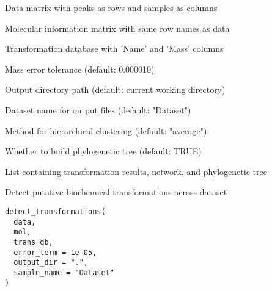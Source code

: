 \documentclass[a4paper]{book}
\begin{document}
%
\begin{Arguments}
\begin{ldescription}
\item[\code{data}] Data matrix with peaks as rows and samples as columns

\item[\code{mol}] Molecular information matrix with same row names as data

\item[\code{trans\_db}] Transformation database with 'Name' and 'Mass' columns

\item[\code{error\_term}] Mass error tolerance (default: 0.000010)

\item[\code{output\_dir}] Output directory path (default: current working directory)

\item[\code{sample\_name}] Dataset name for output files (default: "Dataset")

\item[\code{clustering\_method}] Method for hierarchical clustering (default: "average")

\item[\code{build\_tree}] Whether to build phylogenetic tree (default: TRUE)
\end{ldescription}
\end{Arguments}
%
\begin{Value}
List containing transformation results, network, and phylogenetic tree
\end{Value}
%
\begin{Description}
Detect putative biochemical transformations across dataset
\end{Description}
%
\begin{Usage}
\begin{verbatim}
detect_transformations(
  data,
  mol,
  trans_db,
  error_term = 1e-05,
  output_dir = ".",
  sample_name = "Dataset"
)
\end{verbatim}
\end{Usage}
%
\end{document}

